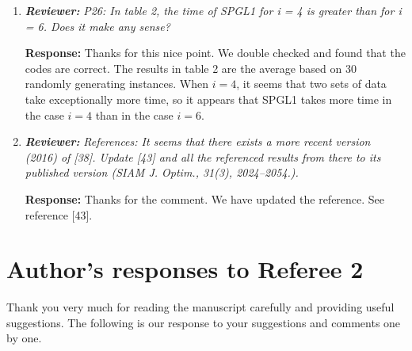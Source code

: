 \documentclass{article}
\begin{document}
\begin{enumerate}
    \item  \textit{\textbf{Reviewer:}} \textit{P26: In table 2, the time of SPGL1 for i = 4 is greater than for i = 6. Does it make any sense?}
	
	\textbf{Response:} Thanks for this nice point. We double checked and found that the codes are correct. The results in table 2 are the average based on 30 randomly generating instances. When $i = 4$, it seems that two sets of data take exceptionally more time, so it appears that SPGL1 takes more time in the case $i = 4$ than in the case $i = 6$.

    \item  \textit{\textbf{Reviewer:}} \textit{References: It seems that there exists a more recent version (2016) of [38]. Update [43] and all the referenced results from there to its published version (SIAM J. Optim., 31(3), 2024--2054.).}
	
	\textbf{Response:} Thanks for the comment. We have updated the reference. See reference [43].






\end{enumerate}


\section*{Author's responses to Referee 2}
Thank you very much for reading the manuscript carefully and providing useful suggestions. The following is our response to your suggestions and comments one by one.
\end{document}
